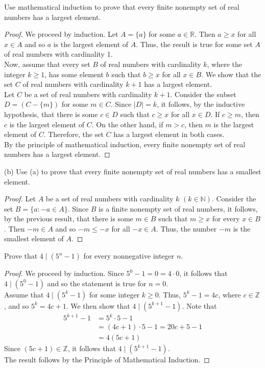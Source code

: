 \documentclass[12pt]{article}
\newcommand{\N}{\mathbb{N}}
\newcommand{\Z}{\mathbb{Z}}
\newcommand{\R}{\mathbb{R}}
\newenvironment{problem}[2][Problem]{\begin{trivlist}
		\item[\hskip \labelsep {\bfseries #1}\hskip \labelsep {\bfseries #2.}]}{\end{trivlist}}
\begin{document}
\begin{problem}{20}
	Use mathematical induction to prove that every finite nonempty set of real numbers has a largest element.
	\begin{proof}
		We proceed by induction. Let $A=\{a\}$ for some $a\in \R$. Then $a\geq x$ for all $x\in A$ and so $a$ is the largest element of $A$. Thus, the result is true for some set $A$ of real numbers with cardinality 1. \\
		Now, assume that every set $B$ of real numbers with cardinality $k$, where the integer $k\geq 1$, has some element $b$ such that $b\geq x$ for all $x\in B$. We show that the set $C$ of real numbers with cardinality $k+1$ has a largest element.\\
		Let $C$ be a set of real numbers with cardinality $k+1$. Consider the subset $D = (C-\{m\})$ for some $m\in C$. Since $|D| = k$, it follows, by the inductive hypothesis, that there is some $c\in D$ such that $c\geq x$ for all $x\in D$. If $c\geq m$, then $c$ is the largest element of $C$. On the other hand, if $m>c$, then $m$ is the largest element of $C$. Therefore, the set $C$ has a largest element in both cases.\\
		By the principle of mathematical induction, every finite nonempty set of real numbers has a largest element.
	\end{proof}

(b) Use (a) to prove that every finite nonempty set of real numbers has a smallest element.
\begin{proof}
	Let $A$ be a set of real numbers with cardinality $k$ $(k\in \N)$. Consider the set $B=\{a:-a\in A\}$. Since $B$ is a finite nonempty set of real numbers, it follows, by the previous result, that there is some $m\in B$ such that $m\geq x$ for every $x\in B$. Then $-m\in A$ and so $-m\leq -x$ for all $-x\in A$. Thus, the number $-m$ is the smallest element of $A$.
\end{proof}
\end{problem}

\begin{problem}{21}
	Prove that $4\mid (5^{n}-1)$ for every nonnegative integer $n$.
	\begin{proof}
		We proceed by induction. Since $5^{0}-1 = 0 = 4\cdot 0$, it follows that $4\mid(5^{0}-1)$ and so the statement is true for $n=0$.\\
		Assume that $4\mid (5^{k}-1)$ for some integer $k\geq 0$. Thus, $5^{k}-1 = 4c$, where $c\in \Z$, and so $5^{k} = 4c +1$. We then show that $4\mid (5^{k+1}-1)$. Note that
		\begin{align*}
			5^{k+1}-1 &= 5^{k}\cdot 5-1\\
			&= (4c+1)\cdot 5-1 = 20c+5-1\\
			&= 4(5c+1)			
		\end{align*}
	Since $(5c+1)\in \Z$, it follows that $4\mid (5^{k+1}-1)$. 
	\\
	The result follows by the Principle of Mathematical Induction.
	\end{proof}
\end{problem}
 
\end{document}
